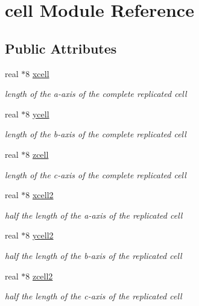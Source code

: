 \hypertarget{classcell}{\section{cell Module Reference}
\label{classcell}
}
\subsection*{Public Attributes}
\begin{DoxyCompactItemize}
\item 
real $\ast$8 \hyperlink{classcell_a695c86493edeb02d8cc35f9a33b33124}{xcell}
\begin{DoxyCompactList}\small\item\em length of the a-\/axis of the complete replicated cell \end{DoxyCompactList}\item 
real $\ast$8 \hyperlink{classcell_a373e688332561e88d2268dceac0f21c8}{ycell}
\begin{DoxyCompactList}\small\item\em length of the b-\/axis of the complete replicated cell \end{DoxyCompactList}\item 
real $\ast$8 \hyperlink{classcell_a00c781998a1d4a6d64326febcb839363}{zcell}
\begin{DoxyCompactList}\small\item\em length of the c-\/axis of the complete replicated cell \end{DoxyCompactList}\item 
real $\ast$8 \hyperlink{classcell_ae3226a3f8ee2919d369164e281e77ca5}{xcell2}
\begin{DoxyCompactList}\small\item\em half the length of the a-\/axis of the replicated cell \end{DoxyCompactList}\item 
real $\ast$8 \hyperlink{classcell_ab57ae66a1f19940f97975944cc3c9aec}{ycell2}
\begin{DoxyCompactList}\small\item\em half the length of the b-\/axis of the replicated cell \end{DoxyCompactList}\item 
real $\ast$8 \hyperlink{classcell_ae51dbd23294cbee762f560a974852eec}{zcell2}
\begin{DoxyCompactList}\small\item\em half the length of the c-\/axis of the replicated cell \end{DoxyCompactList}\end{DoxyCompactItemize}


